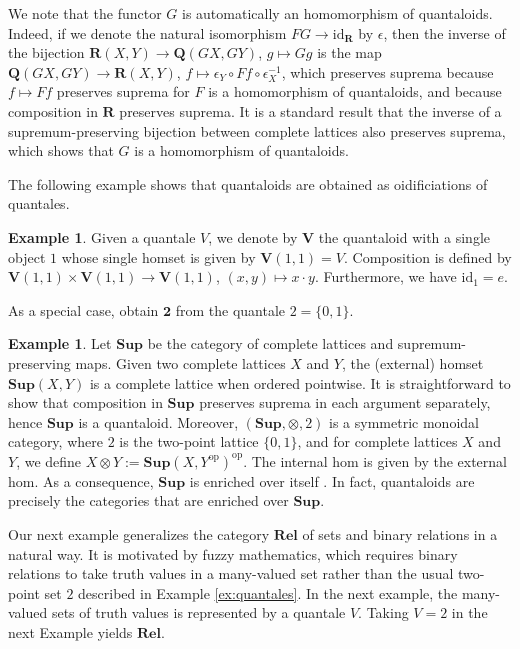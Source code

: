 \documentclass[12pt]{tac}
\theoremstyle{definition}
\newtheorem{example}[theorem]{Example}
\theoremstyle{remark}
\newcommand{\<}{\langle}
\renewcommand{\>}{\rangle}
\renewcommand{\:}{\colon}
\newcommand{\id}{\mathrm{id}}
\begin{document}
We note that the functor $G$ is automatically an homomorphism of quantaloids. Indeed, if we denote the natural isomorphism $FG\to \id_{\mathbf R}$ by $\epsilon$, then the inverse of the bijection $\mathbf R(X,Y)\to\mathbf Q(GX,GY)$, $g\mapsto Gg$ is the map $\mathbf Q(GX,GY)\to\mathbf R(X,Y)$, $f\mapsto \epsilon_Y\circ Ff\circ\epsilon_X^{-1}$, which preserves suprema because $f\mapsto Ff$ preserves suprema for $F$ is a homomorphism of quantaloids, and because composition in $\mathbf R$ preserves suprema. It is a standard result that the inverse of a supremum-preserving bijection between complete lattices also preserves suprema, which shows that $G$ is a homomorphism of quantaloids. 


The following example shows that quantaloids are obtained as oidificiations of quantales.
\begin{example}\label{ex:quantale-induced quantaloid}
    Given a quantale $V$, we denote by $\mathbf V$ the quantaloid with a single object $1$ whose single homset is given by $\mathbf{V}(1,1)=V$. Composition is defined by $\mathbf V(1,1)\times\mathbf V(1,1)\to\mathbf V(1,1)$, $(x,y)\mapsto x\cdot y$. Furthermore, we have $\id_1=e$.

    As a special case, obtain $\mathbf 2$ from the quantale $2=\{0,1\}$.
\end{example}

\begin{example}\label{ex:Sup}\cite[Section 2.1]{eklund2018semigroups}
    Let $\mathbf{Sup}$ be the category of complete lattices and supremum-preserving maps. Given two complete lattices $X$ and $Y$, the (external) homset $\mathbf{Sup}(X,Y)$ is a complete lattice when ordered pointwise. It is straightforward to show that composition in $\mathbf{Sup}$ preserves suprema in each argument separately, hence $\mathbf{Sup}$ is a quantaloid.
Moreover, $(\mathbf{Sup},\otimes,2)$ is a symmetric monoidal category, where $2$ is the two-point lattice $\{0,1\}$, and  for complete lattices $X$ and $Y$, we define $X\otimes Y:= \mathbf{Sup}(X,Y^\mathrm{op})^\mathrm{op}$. The internal hom is given by the external hom. 
As a consequence, $\mathbf{Sup}$ is enriched over itself \cite[Proposition 6.2.6]{borceux:handbook2}. In fact, quantaloids are precisely the categories that are enriched over $\mathbf{Sup}$.
\end{example}


Our next example generalizes the category $\mathbf{Rel}$ of sets and binary relations in a natural way. It is motivated by fuzzy mathematics, which requires binary relations to take truth values in a many-valued set rather than the usual two-point set $2$ described in Example \ref{ex:quantales}. In the next example, the many-valued sets of truth values is represented by a quantale $V$. Taking $V=2$ in the next Example yields $\mathbf{Rel}$.
\end{document}
